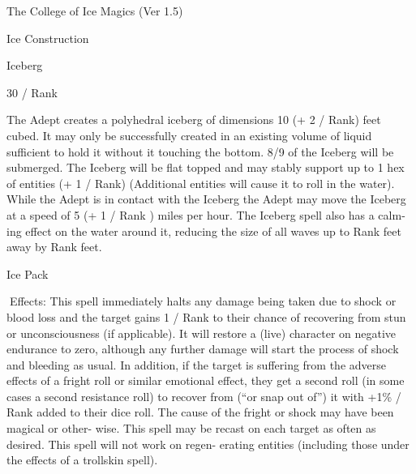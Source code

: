 \begin{Chapter}{The College of Ice Magics (Ver 1.5)}
\begin{spell}[S-8]{Ice Construction }
\begin{effects}
\end{effects}
\end{spell}

\begin{spell}[S-9]{Iceberg }

30 / Rank 
\begin{effects}
The  Adept creates a polyhedral iceberg of 
dimensions 10 (+ 2 / Rank) feet cubed. It may only 
be  successfully  created  in  an  existing  volume  of 
liquid  sufficient  to  hold  it  without  it  touching  the 
bottom. 8/9 of the Iceberg will be submerged. The 
Iceberg will be flat topped and may stably support 
up  to  1  hex  of  entities  (+  1  /  Rank)  (Additional 
entities will cause it to roll in the water). While the 
Adept is in contact with the Iceberg the Adept may 
move  the  Iceberg  at  a  speed  of  5  (+  1  /  Rank  ) 
miles  per  hour.  The  Iceberg  spell  also  has  a calm-
ing effect on the water around it, reducing the size 
of all waves up to Rank feet away by Rank feet. 

\end{effects}
\end{spell}

\begin{spell}[S-10]{Ice Pack }


Effects:  This  spell  immediately  halts  any  damage 
being  taken  due  to  shock  or  blood  loss  and  the 
target gains 1 / Rank to their chance of recovering 
from stun or unconsciousness (if applicable). It will 
restore  a  (live)  character  on  negative  endurance  to 
zero,  although  any  further  damage  will  start  the 
process of shock and bleeding as usual. In addition, 
if the target is suffering from the adverse effects of 
a  fright  roll  or  similar  emotional  effect, they  get  a 
second roll (in some cases a second resistance roll) 
to  recover  from  (“or  snap  out  of”)  it  with  +1\%  / 
Rank  added  to  their  dice  roll.  The  cause  of  the 
fright  or  shock  may  have  been  magical  or  other-
wise.  This  spell  may  be  recast  on  each  target  as 
often as desired. This spell will not work on regen-
erating entities (including those under the effects of 
a trollskin spell). 


\end{spell}
\end{Chapter}
